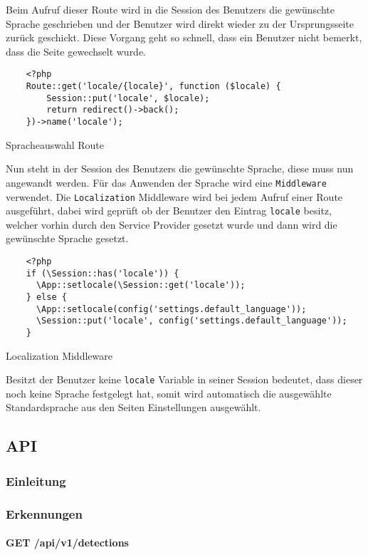 Beim Aufruf dieser Route wird in die Session des Benutzers die gewünschte
Sprache geschrieben und der Benutzer wird direkt wieder zu der Ursprungsseite
zurück geschickt. Diese Vorgang geht so schnell, dass ein Benutzer nicht
bemerkt, dass die Seite gewechselt wurde.

\begin{listing}[H]
  \begin{verbatim}
    <?php
    Route::get('locale/{locale}', function ($locale) {
        Session::put('locale', $locale);
        return redirect()->back();
    })->name('locale');
  \end{verbatim}
  \caption{Spracheauswahl Route}
\end{listing}

Nun steht in der Session des Benutzers die gewünschte Sprache, diese muss nun
angewandt werden. Für das Anwenden der Sprache wird eine \verb|Middleware|
verwendet. Die \verb|Localization| Middleware wird bei jedem Aufruf einer Route
ausgeführt, dabei wird geprüft ob der Benutzer den Eintrag \verb|locale|
besitz, welcher vorhin durch den Service Provider gesetzt wurde und dann wird
die gewünschte Sprache gesetzt.

\begin{listing}[H]
  \begin{verbatim}
    <?php
    if (\Session::has('locale')) {
      \App::setlocale(\Session::get('locale'));
    } else {
      \App::setlocale(config('settings.default_language'));
      \Session::put('locale', config('settings.default_language'));
    }
  \end{verbatim}
  \caption{Localization Middleware}
\end{listing}

Besitzt der Benutzer keine \verb|locale| Variable in seiner Session bedeutet,
dass dieser noch keine Sprache festgelegt hat, somit wird automatisch die
ausgewählte Standardsprache aus den Seiten Einstellungen ausgewählt.

\subsection{API}
\subsubsection{Einleitung}
\subsubsection{Erkennungen}
\paragraph{GET /api/v1/detections}\mbox{}\\

